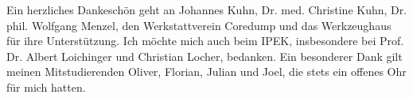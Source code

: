 
Ein herzliches Dankeschön geht an Johannes Kuhn, Dr. med. Christine Kuhn, Dr. phil. Wolfgang Menzel, den Werkstattverein Coredump und das Werkzeughaus für ihre Unterstützung. Ich möchte mich auch beim IPEK, insbesondere bei Prof. Dr. Albert Loichinger und Christian Locher, bedanken. Ein besonderer Dank gilt meinen Mitstudierenden Oliver, Florian, Julian und Joel, die stets ein offenes Ohr für mich hatten.

